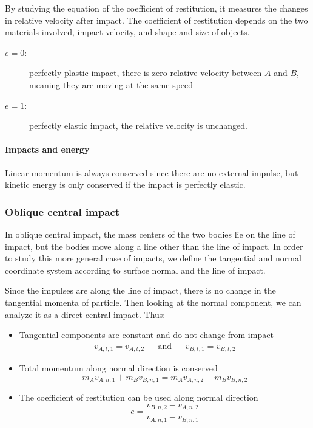 \documentclass[10pt, twocolumn]{article}
\begin{document}
By studying the equation of the coefficient of restitution, it measures the changes in relative velocity after impact.
The coefficient of restitution depends on the two materials involved, impact velocity, and shape and size of objects.
\begin{description}
  \item[\(e = 0\):] perfectly plastic impact, there is zero relative velocity between \(A\) and \(B\), meaning they are moving at the same speed
  \item[\(e = 1\):] perfectly elastic impact, the relative velocity is unchanged.
\end{description}

\paragraph{Impacts and energy}
Linear momentum is always conserved since there are no external impulse, but kinetic energy is only conserved if the impact is perfectly elastic.


\subsubsection{Oblique central impact}
In oblique central impact, the mass centers of the two bodies lie on the line of impact, but the bodies move along a line other than the line of impact.
In order to study this more general case of impacts, we define the tangential and normal coordinate system according to surface normal and the line of impact.

Since the impulses are along the line of impact, there is no change in the tangential momenta of particle.
Then looking at the normal component, we can analyze it as a direct central impact.
Thus:
\begin{itemize}
  \item Tangential components are constant and do not change from impact
        \begin{align*}
          v_{A,t,1} = v_{A,t,2} &  & \mathrm{and} &  & v_{B,t,1} = v_{B,t,2}
        \end{align*}
  \item Total momentum along normal direction is conserved
        \[
          m_A v_{A,n,1} + m_B v_{B,n,1} = m_A v_{A,n,2} + m_B v_{B,n,2}
        \]
  \item The coefficient of restitution can be used along normal direction
        \[
          e = \frac{v_{B,n,2} - v_{A,n,2}}{v_{A,n,1} - v_{B,n,1}}
        \]
\end{itemize}
\end{document}
